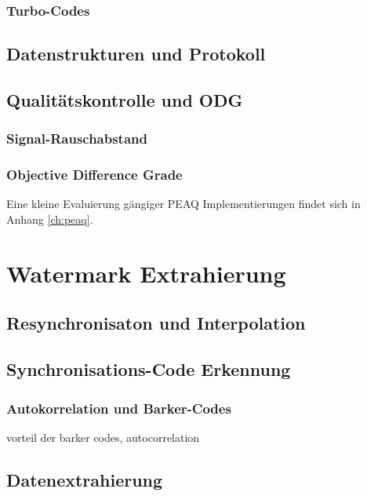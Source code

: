 \subsubsection{Turbo-Codes}

\subsection{Datenstrukturen und Protokoll}
\label{sec:protokoll}

\subsection{Qualitätskontrolle und ODG }
\label{sec:qualitaetskontrolle}

\subsubsection{Signal-Rauschabstand} 

\subsubsection{Objective Difference Grade} 

Eine kleine Evaluierung gängiger PEAQ Implementierungen findet sich in Anhang \ref{ch:peaq}.

\section{Watermark Extrahierung}
\label{sec:extraction}


\subsection{Resynchronisaton und Interpolation}

\subsection{Synchronisations-Code Erkennung}

\subsubsection{Autokorrelation und Barker-Codes} 
\label{sec:barkercode}


vorteil der barker codes, autocorrelation

\subsection{Datenextrahierung}



